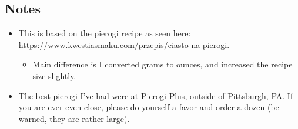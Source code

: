 \begin{multicols}{2}
\subsection*{Notes}
\begin{itemize}
    \item This is based on the pierogi recipe as seen here: \url{https://www.kwestiasmaku.com/przepis/ciasto-na-pierogi}.
    \begin{itemize}
        \item Main difference is I converted grams to ounces, and increased the recipe size slightly.
    \end{itemize}
    \item The best pierogi I've had were at Pierogi Plus, outside of Pittsburgh, PA. If you are ever even close, please do yourself a favor and order a dozen (be warned, they are rather large).
\end{itemize}
\end{multicols}
\clearpage